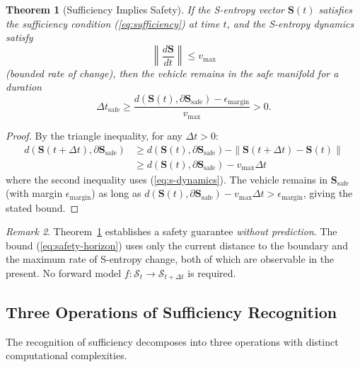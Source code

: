 \documentclass[twocolumn,10pt]{article}
\newtheorem{theorem}{Theorem}[section]
\theoremstyle{definition}
\theoremstyle{remark}
\newtheorem{remark}[theorem]{Remark}
\newcommand{\Sent}{\mathbf{S}}
\begin{document}
\begin{theorem}[Sufficiency Implies Safety]\label{thm:sufficiency-safety}
If the S-entropy vector $\Sent(t)$ satisfies the sufficiency condition
(\ref{eq:sufficiency}) at time $t$, and the S-entropy dynamics satisfy
\begin{equation}\label{eq:s-dynamics}
  \left\|\frac{d\Sent}{dt}\right\| \leq v_{\max}
\end{equation}
(bounded rate of change), then the vehicle remains in the safe manifold for
a duration
\begin{equation}\label{eq:safety-horizon}
  \Delta t_{\mathrm{safe}} \geq
  \frac{d(\Sent(t), \partial \Sent_{\mathrm{safe}}) - \epsilon_{\mathrm{margin}}}{v_{\max}} > 0.
\end{equation}
\end{theorem}

\begin{proof}
By the triangle inequality, for any $\Delta t > 0$:
\begin{align}
  d(\Sent(t + \Delta t), \partial \Sent_{\mathrm{safe}})
  &\geq d(\Sent(t), \partial \Sent_{\mathrm{safe}})
  - \|\Sent(t + \Delta t) - \Sent(t)\| \\
  &\geq d(\Sent(t), \partial \Sent_{\mathrm{safe}})
  - v_{\max} \Delta t
\end{align}
where the second inequality uses (\ref{eq:s-dynamics}). The vehicle remains
in $\Sent_{\mathrm{safe}}$ (with margin $\epsilon_{\mathrm{margin}}$) as
long as $d(\Sent(t), \partial \Sent_{\mathrm{safe}}) - v_{\max} \Delta t >
\epsilon_{\mathrm{margin}}$, giving the stated bound.
\end{proof}

\begin{remark}\label{rem:no-prediction}
Theorem~\ref{thm:sufficiency-safety} establishes a safety guarantee
\emph{without prediction}. The bound (\ref{eq:safety-horizon}) uses only
the current distance to the boundary and the maximum rate of S-entropy
change, both of which are observable in the present. No forward model
$f: \mathcal{S}_t \to \mathcal{S}_{t+\Delta t}$ is required.
\end{remark}

\subsection{Three Operations of Sufficiency Recognition}

The recognition of sufficiency decomposes into three operations with
distinct computational complexities.
\end{document}
